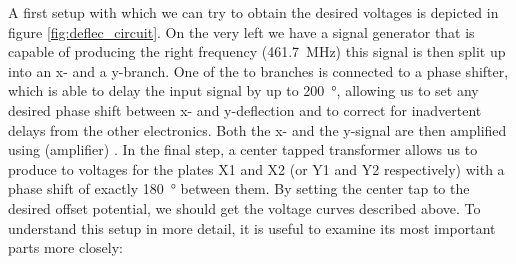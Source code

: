 A first setup with which we can try to obtain the desired voltages is depicted in figure \ref{fig:deflec_circuit}. On the  very left we have a signal generator that is capable of producing the right frequency (\SI{461.7}{\mega\hertz}) this signal is then split up into an x- and a y-branch. One of the to branches is connected to a phase shifter, which is able to delay the input signal by up to \SI{200}{\degree}, allowing us to set any desired phase shift between x- and y-deflection and to correct for inadvertent delays from the other electronics. Both the x- and the y-signal are then amplified using (amplifier) . In the final step, a center tapped transformer allows us to produce to voltages for the plates X1 and X2 (or Y1 and Y2 respectively) with a phase shift of exactly \SI{180}{\degree} between them. By setting the center tap to the desired offset potential, we should get the voltage curves described above. To understand this setup in more detail, it is useful to examine its most important parts more closely:

